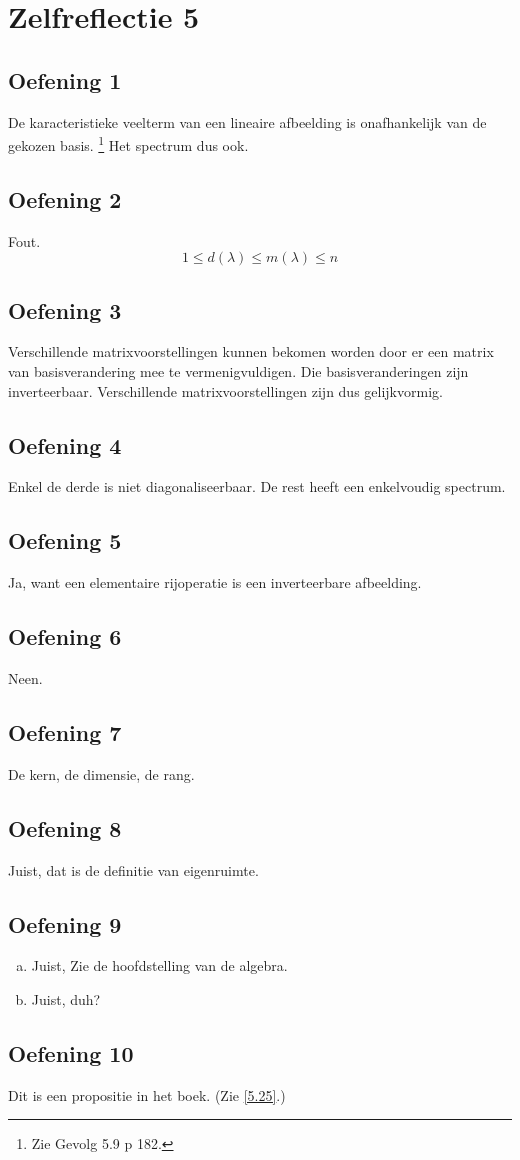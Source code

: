 \documentclass[lineaire_algebra_oplossingen.tex]{subfiles}
\begin{document}
\section{Zelfreflectie 5}
\subsection{Oefening 1}
De karacteristieke veelterm van een lineaire afbeelding is onafhankelijk van de gekozen basis. \footnote{Zie Gevolg 5.9 p 182.}
Het spectrum dus ook.

\subsection{Oefening 2}
Fout.
\[
1 \le d(\lambda) \le m(\lambda) \le n
\]

\subsection{Oefening 3}
Verschillende matrixvoorstellingen kunnen bekomen worden door er een matrix van basisverandering mee te vermenigvuldigen.
Die basisveranderingen zijn inverteerbaar. 
Verschillende matrixvoorstellingen zijn dus gelijkvormig.

\subsection{Oefening 4}
Enkel de derde is niet diagonaliseerbaar. De rest heeft een enkelvoudig spectrum.

\subsection{Oefening 5}
Ja, want een elementaire rijoperatie is een inverteerbare afbeelding.

\subsection{Oefening 6}
Neen.

\subsection{Oefening 7}
De kern, de dimensie, de rang. 

\subsection{Oefening 8}
Juist, dat is de definitie van eigenruimte.

\subsection{Oefening 9}
\begin{enumerate}[(a)]
\item Juist, Zie de hoofdstelling van de algebra.
\item Juist, duh?
\end{enumerate}

\subsection{Oefening 10}
Dit is een propositie in het boek. (Zie \ref{5.25}.)
\end{document}
